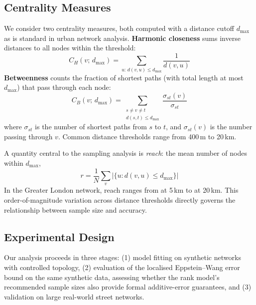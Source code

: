 
\subsection{Centrality Measures}

We consider two centrality measures, both computed with a distance cutoff $d_{\max}$ as is standard in urban network analysis. \textbf{Harmonic closeness} \citep{Rochat2009, Freeman1979} sums inverse distances to all nodes within the threshold:
\begin{equation}
  C_H(v;\, d_{\max}) = \sum_{u:\, d(v,u) \leq d_{\max}} \frac{1}{d(v, u)}
\end{equation}
\textbf{Betweenness} \citep{Freeman1977} counts the fraction of shortest paths (with total length at most $d_{\max}$) that pass through each node:
\begin{equation}
  C_B(v;\, d_{\max}) = \sum_{\substack{s \neq v \neq t \\ d(s,t) \leq d_{\max}}} \frac{\sigma_{st}(v)}{\sigma_{st}}
\end{equation}
where $\sigma_{st}$ is the number of shortest paths from $s$ to $t$, and $\sigma_{st}(v)$ is the number passing through $v$. Common distance thresholds range from 400\,m to 20\,km.

A quantity central to the sampling analysis is \emph{reach}: the mean number of nodes within $d_{\max}$,
\begin{equation}
  r = \frac{1}{N} \sum_{v} \left| \{u : d(v, u) \leq d_{\max}\} \right|
\end{equation}
In the Greater London network, reach ranges from \glaFiveKmReach{} at 5\,km to \glaTwentyKmReach{} at 20\,km. This order-of-magnitude variation across distance thresholds directly governs the relationship between sample size and accuracy.

\subsection{Experimental Design}

Our analysis proceeds in three stages: (1) model fitting on synthetic networks with controlled topology, (2) evaluation of the localised Eppstein--Wang error bound on the same synthetic data, assessing whether the rank model's recommended sample sizes also provide formal additive-error guarantees, and (3) validation on large real-world street networks.

